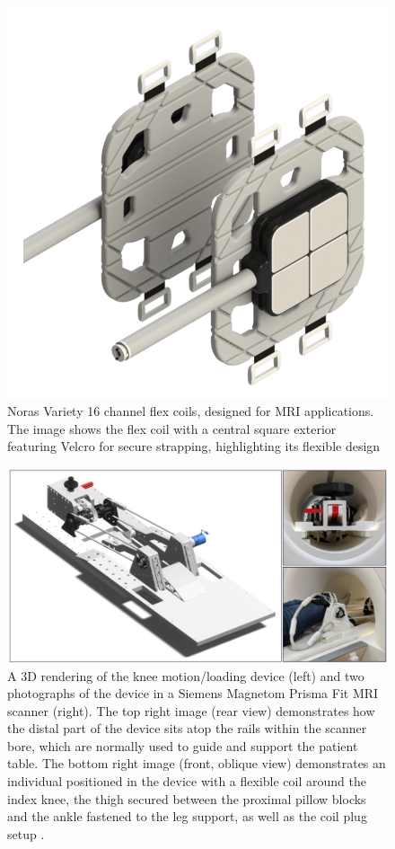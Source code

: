 \documentclass{micro-econ-thesis}
\begin{document}
\begin{figure}[H]
	\centering
	\includegraphics[scale=0.2]{coils}
	\caption{Noras Variety 16 channel flex coils, designed for MRI applications. The image shows the flex coil with a central square exterior featuring Velcro for secure strapping, highlighting its flexible design}
	\label{fig:coils}
\end{figure}


\begin{figure}[H]
	\centering
	\includegraphics[width=0.9\linewidth]{knee_device}
	\caption{A 3D rendering of the knee motion/loading device (left) and two photographs of the device in a Siemens Magnetom Prisma Fit MRI scanner (right). The top right image (rear view) demonstrates how the distal part of the device sits atop the rails within the scanner bore, which are normally used to guide and support the patient table. The bottom right image (front, oblique view) demonstrates an individual positioned in the device with a flexible coil around the index knee, the thigh secured between the proximal pillow blocks and the ankle fastened to the leg support, as well as the coil plug setup \parencite{brisson_novel_2022}. }
	\label{fig:kneedevice}
\end{figure}
 
\end{document}
